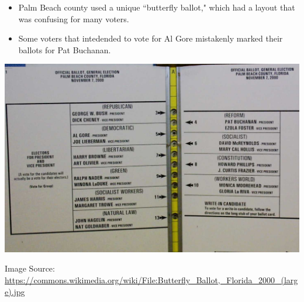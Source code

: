 \documentclass[10pt]{beamer}
\begin{document}
\begin{frame}
\begin{itemize}
\item Palm Beach county used a unique ``butterfly ballot," which had a layout that was confusing for many voters.
\vspace{5pt}
\item Some voters that intedended to vote for Al Gore mistakenly marked their ballots for Pat Buchanan.  
\end{itemize}
\begin{center}
\includegraphics[scale=0.15]{figure/Butterfly_Ballot.jpg}
\end{center}
\tiny
Image Source:
\url{https://commons.wikimedia.org/wiki/File:Butterfly_Ballot,_Florida_2000_(large).jpg}

\end{frame}
\end{document}
